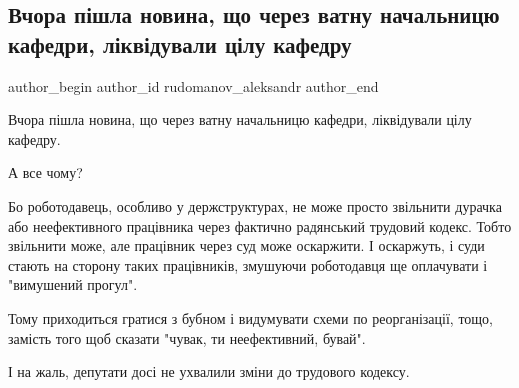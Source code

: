  
 
 
 
 
 
\subsection{Вчора пішла новина, що через ватну начальницю кафедри, ліквідували цілу кафедру}
\label{sec:22_07_2021.fb.rudomanov_aleksandr.1.kafedra_bilchenko_vata}
 
\ifcmt
 author_begin
   author_id rudomanov_aleksandr
 author_end
\fi

Вчора пішла новина, що через ватну начальницю кафедри, ліквідували цілу
кафедру.

А все чому?

Бо роботодавець, особливо у держструктурах, не може просто звільнити дурачка
або неефективного працівника через фактично радянський трудовий кодекс. Тобто
звільнити може, але працівник через суд може оскаржити. І оскаржуть, і суди
стають на сторону таких працівників, змушуючи роботодавця ще оплачувати і
"вимушений прогул".

Тому приходиться гратися з бубном і видумувати схеми по реорганізації, тощо,
замість того щоб сказати "чувак, ти неефективний, бувай".

І на жаль, депутати досі не ухвалили зміни до трудового кодексу.

